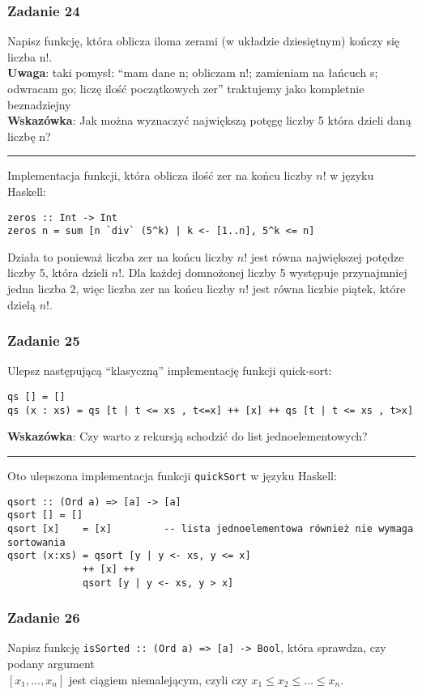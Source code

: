 \documentclass[11pt,a4paper]{article}
\begin{document}
\subsubsection{Zadanie 24}
Napisz funkcję, która oblicza iloma zerami (w układzie dziesiętnym) kończy się liczba n!. \\
\textbf{Uwaga}: taki pomysł: ``mam dane n; obliczam n!; zamieniam na łańcuch s; odwracam go; liczę ilość początkowych zer'' traktujemy jako kompletnie beznadziejny \\
\textbf{Wskazówka}: Jak można wyznaczyć największą potęgę liczby 5 która dzieli daną liczbę n?

\bigskip
\hrule
\bigskip

Implementacja funkcji, która oblicza ilość zer na końcu liczby \(n!\) w języku Haskell:
\begin{Verbatim}[frame=single]
zeros :: Int -> Int
zeros n = sum [n `div` (5^k) | k <- [1..n], 5^k <= n]
\end{Verbatim}
Działa to ponieważ liczba zer na końcu liczby \(n!\) jest równa największej potędze liczby 5, która dzieli \(n!\). Dla każdej domnożonej liczby 5 występuje przynajmniej jedna liczba 2, więc liczba zer na końcu liczby \(n!\) jest równa liczbie piątek, które dzielą \(n!\).

\subsubsection{Zadanie 25}
Ulepsz następującą ``klasyczną'' implementację funkcji quick-sort:
\begin{Verbatim}[frame=single]
qs [] = []
qs (x : xs) = qs [t | t <= xs , t<=x] ++ [x] ++ qs [t | t <= xs , t>x]
\end{Verbatim}
\textbf{Wskazówka}: Czy warto z rekursją schodzić do list jednoelementowych?

\bigskip
\hrule
\bigskip

Oto ulepszona implementacja funkcji \texttt{quickSort} w języku Haskell:
\begin{Verbatim}[frame=single]
qsort :: (Ord a) => [a] -> [a]
qsort [] = []
qsort [x]    = [x]         -- lista jednoelementowa również nie wymaga sortowania
qsort (x:xs) = qsort [y | y <- xs, y <= x]
             ++ [x] ++
             qsort [y | y <- xs, y > x]
\end{Verbatim}

\subsubsection{Zadanie 26}
Napisz funkcję \texttt{isSorted :: (Ord a) => [a] -> Bool}, która sprawdza, czy podany
argument \\$[x_1, \dots, x_n]$ jest ciągiem niemalejącym, czyli czy $x_1 \leq x_2 \leq \dots \leq x_n$.
\end{document}
